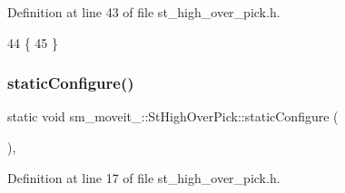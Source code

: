 Definition at line 43 of file st\+\_\+high\+\_\+over\+\_\+pick.\+h.


\begin{DoxyCode}
44     \{
45     \}
\end{DoxyCode}
\mbox{\label{structsm__moveit__3_1_1StHighOverPick_a9056a1e6e003221a6a21ae8239633ba0}} 
\subsubsection{\texorpdfstring{static\+Configure()}{staticConfigure()}}
{\footnotesize\ttfamily static void sm\+\_\+moveit\+\_\+::\+St\+High\+Over\+Pick\+::static\+Configure (\begin{DoxyParamCaption}{ }\end{DoxyParamCaption})\hspace{0.3cm}{\ttfamily [inline]}, {\ttfamily [static]}}



Definition at line 17 of file st\+\_\+high\+\_\+over\+\_\+pick.\+h.


